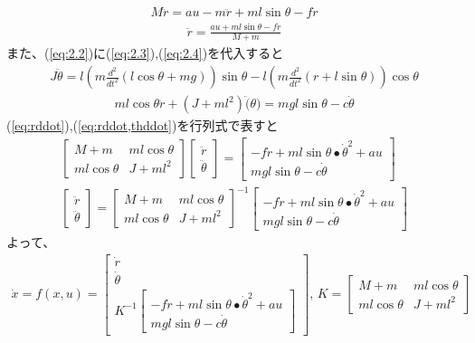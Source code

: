\documentclass[a4j,11pt,twoside]{ujbook}
\begin{document}
\begin{eqnarray}
	M\ddot{r} = au - m\ddot{r}+ml\sin{\theta}-f\dot{r}
\end{eqnarray}
\begin{eqnarray}
\ddot{r} = \frac{au + ml\sin{\theta}-f\dot{r}}{M+m}
\label{eq:rddot}
\end{eqnarray}
また、(\ref{eq:2.2})に(\ref{eq:2.3}),(\ref{eq:2.4})を代入すると
\begin{eqnarray}
	J\ddot{\theta} = l\left(m\frac{d^2}{dt^2}(l\cos{\theta}+mg) \right)\sin{\theta}
	- l \left( m\frac{d^2}{dt^2}(r+l\sin{\theta}) \right)\cos{\theta}
\end{eqnarray}
\begin{eqnarray}
ml\cos{\theta}\ddot{r}+(J+ml^2)\ddot(\theta)=mgl\sin{\theta}-c\dot{\theta}
\label{eq:rddot,thddot}
\end{eqnarray}
(\ref{eq:rddot}),(\ref{eq:rddot,thddot})を行列式で表すと
\begin{eqnarray}
	\left[
	\begin{array}{cc}
		M+m & ml\cos{\theta}\\
		ml\cos{\theta} & J+ml^2
	\end{array}
	\right]
	\left[
	\begin{array}{c}
		\ddot{r} \\
		\ddot{\theta}
	\end{array}
	\right] =
	\left[
	\begin{array}{c}
		- f \dot{r} + ml\sin{\theta}\bullet\dot{\theta}^2 + au\\
		mgl\sin{\theta} - c\dot{\theta}
	\end{array}
	\right]\\
	\left[
	\begin{array}{c}
		\ddot{r} \\
		\ddot{\theta}
	\end{array}
	\right] =
	\left[
	\begin{array}{cc}
		M+m & ml\cos{\theta}\\
		ml\cos{\theta} & J+ml^2
	\end{array}
	\right]^{-1}
	\left[
	\begin{array}{c}
		- f \dot{r} + ml\sin{\theta}\bullet\dot{\theta}^2 + au\\
		mgl\sin{\theta} - c\dot{\theta}
	\end{array}
	\right]
\end{eqnarray}
よって、
\begin{eqnarray}
\dot{x}=f(x,u)=\left[
\begin{array}{c}

\dot{r}\\
\dot{\theta}\\
K^{-1}\left[
\begin{array}{c}
- f \dot{r} + ml\sin{\theta}\bullet\dot{\theta}^2 + au\\
mgl\sin{\theta} - c\dot{\theta}
\end{array}
\right]

\end{array}
\right],\,
K = \left[
\begin{array}{cc}
M+m & ml\cos{\theta}\\
ml\cos{\theta} & J+ml^2
\end{array}
\right]
\end{eqnarray}
\end{document}
